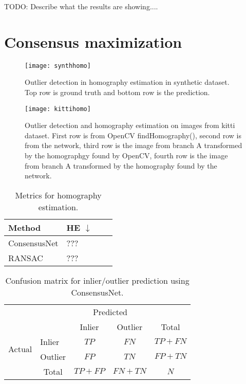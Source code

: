 TODO: Describe what the results are showing....

\section{Consensus maximization}

\begin{figure}[H]
	\centering
	\texttt{[image: synthhomo]}
	\caption{Outlier detection in homography estimation in synthetic dataset. Top row is ground truth and bottom row is the prediction.}
	\label{fig:synthhomo}
\end{figure}

\begin{figure}[H]
	\centering
	\texttt{[image: kittihomo]}
	\caption{Outlier detection and homography estimation on images from kitti dataset. First row is from OpenCV findHomography(), second row is from the network, third row is the image from branch A transformed by the homographgy found by OpenCV, fourth row is the image from branch A transformed by the homography found by the network.}
	\label{fig:kittihomo}
\end{figure}

\begin{table}[H]
	\centering
	\begin{tabular}{|l|l|l|l|}
		\hline
		Method & HE $\downarrow$ \\
		\hline
		ConsensusNet & ??? \\
		RANSAC & ??? \\
		\hline
	\end{tabular}
	\caption{Metrics for homography estimation.}
	\label{table:pointsbenchmark}
\end{table}

\begin{table}[H]
\centering
\begin{tabular}{l|l|c|c|c}
	\multicolumn{2}{c}{}&\multicolumn{2}{c}{Predicted}&\\
	\cline{3-4}
	\multicolumn{2}{c|}{}&Inlier&Outlier&\multicolumn{1}{c}{Total}\\
	\cline{2-4}
	\multirow{2}{*}{Actual}& Inlier & $TP$ & $FN$ & $TP+FN$\\
	\cline{2-4}
	& Outlier & $FP$ & $TN$ & $FP+TN$\\
	\cline{2-4}
	\multicolumn{1}{c}{} & \multicolumn{1}{c}{Total} & \multicolumn{1}{c}{$TP+FP$} & \multicolumn{    1}{c}{$FN+TN$} & \multicolumn{1}{c}{$N$}\\
\end{tabular}
	\caption{Confusion matrix for inlier/outlier prediction using ConsensusNet.}
	\label{table:consensusconfusion}
\end{table}


